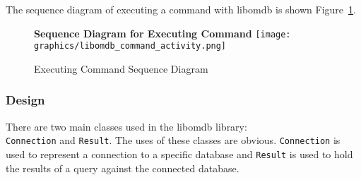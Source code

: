 \documentclass[letterpaper, 12pt]{article}
\newcommand{\inlinecode}[1]{\colorbox{codegrey}{\lstinline[language=C++]{#1}}}
\begin{document}
  \par\vspace{\baselineskip}
  The sequence diagram of executing a command with libomdb is shown Figure~\ref{fig:libomdb_command_sequence}.
  \begin{figure}
    \centering
    \label{fig:libomdb_command_sequence}
    \textbf{Sequence Diagram for Executing Command}
    \texttt{[image: graphics/libomdb\_command\_activity.png]}
    \caption{Executing Command Sequence Diagram}
  \end{figure}

  \par\vspace{\baselineskip}

  \subsubsection{Design}
  There are two main classes used in the libomdb library:  \\
  \inlinecode{Connection} and \inlinecode{Result}. The uses of these classes
  are obvious. \inlinecode{Connection} is used to represent a connection to
  a specific database and \inlinecode{Result} is used to hold the results of a
  query against the connected database.
\end{document}
